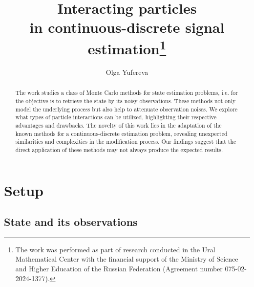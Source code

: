\documentclass[12pt]{llncs}
\begin{document}
\fi

\title{Interacting particles \\in continuous-discrete signal estimation\thanks{The work was performed as part of research conducted
in the Ural Mathematical Center with the financial support
of the Ministry of Science and Higher Education of the Russian
Federation
(Agreement number 075-02-2024-1377).}
}

\author{Olga Yufereva
}

\maketitle

\begin{abstract}
The work studies a class of Monte Carlo methods for state estimation problems, i.e. for the objective is to retrieve the state by its noisy observations. These methods not only model the underlying process but also help to attenuate observation noises.
We explore what types of particle interactions can be utilized, highlighting their respective advantages and drawbacks. The novelty of this work lies in the adaptation of the known methods for a continuous-discrete estimation problem, revealing unexpected similarities and complexities in the modification process. Our findings suggest that the direct application of these methods may not always produce the expected results.

\end{abstract}




\section{Setup}
\subsection{State and its observations}
\end{document}
